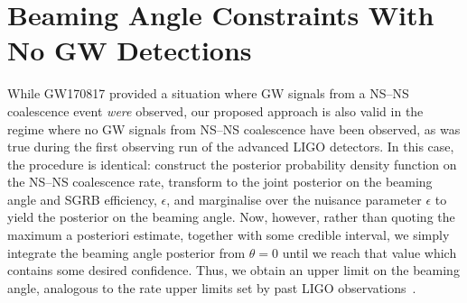\documentclass[twocolumn,nofootinbib]{revtex4-1}
\newcommand{\cbcrate}{{{\mathcal R}}}
\newcommand{\BNS}{\ac{NS}--\ac{NS}\xspace}
\newcommand{\arw}[1]{{\color{dgreen}{#1}}}
\begin{document}
%

\section{Beaming Angle Constraints With No \ac{GW} Detections}
\label{sec:beaming_limits}
While GW170817 provided a situation where \ac{GW} signals from a \BNS
coalescence event \emph{were} observed, our proposed approach is also
valid in the regime where no \ac{GW} signals from \BNS coalescence
have been observed, as was true during the first observing run of the
advanced LIGO detectors.  In this case, the procedure is identical:
construct the posterior probability density function on the \BNS
coalescence rate, transform to the joint posterior on the beaming
angle and \ac{SGRB} efficiency, $\epsilon$, and marginalise over the
nuisance parameter $\epsilon$ to yield the posterior on the beaming
angle.  Now, however, rather than quoting the maximum a posteriori
estimate, together with some credible interval, we simply integrate
the beaming angle posterior from $\theta=0$ until we reach that value
which contains some desired confidence.  Thus, we obtain an upper
limit on the beaming angle, analogous to the rate upper limits set by
past LIGO observations~\cite{Colaboration:2011np}.


\end{document}
